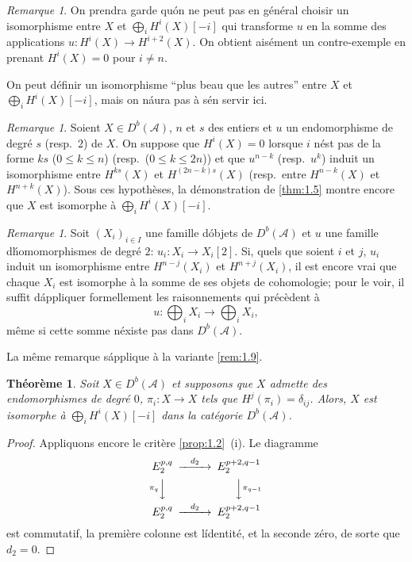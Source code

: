 \documentclass[12pt]{amsart}
\theoremstyle{plain}
\newtheorem{thm}[prop]{Th\'eor\`eme}
\theoremstyle{remark}
\newtheorem{rem}[prop]{Remarque}
\newcommand{\cA}{\mathscr{A}}
\newcommand{\db}{D^b}
\begin{document}
\begin{rem}\label{rem:1.8}
On prendra garde qu\'on ne peut pas en g\'en\'eral choisir un isomorphisme entre $X$ et $\bigoplus_i H^i(X)[-i]$ qui transforme $u$ en la somme des applications $u : H^i(X) \to H^{i+2}(X)$. On obtient ais\'ement un contre-exemple en prenant $H^i(X) = 0$ pour $i \not= n$.

On peut d\'efinir un isomorphisme ``plus beau que les autres'' entre $X$ et $\bigoplus_i H^i(X)[-i]$, mais on n\'aura pas \`a s\'en servir ici.
\end{rem}

\begin{rem}\label{rem:1.9}
Soient $X \in \db(\cA)$, $n$ et $s$ des entiers et $u$ un endomorphisme de degr\'e $s$ (resp.~$2$) de $X$. On suppose que $H^i(X) = 0$ lorsque $i$ n\'est pas de la forme $ks$ ($0 \leq k \leq n$) (resp.~($0 \leq k \leq 2n$)) et que $u^{n-k}$ (resp.~$u^k$) induit un isomorphisme entre $H^{ks}(X)$ et $H^{(2n-k)s}(X)$ (resp.~entre $H^{n-k}(X)$ et $H^{n+k}(X)$). Sous ces hypoth\`eses, la d\'emonstration de \eqref{thm:1.5} montre encore que $X$ est isomorphe \`a $\bigoplus_i H^i(X)[-i]$.
\end{rem}

\begin{rem}\label{rem:1.10}
Soit $(X_i)_{i \in I}$ une famille d\'objets de $\db(\cA)$ et $u$ une famille d\'homomorphismes de degr\'e $2$: $u_i : X_i \to X_i[2]$. Si, quels que soient $i$ et $j$, $u_i$ induit un isomorphisme entre $H^{n-j}(X_i)$ et $H^{n+j}(X_i)$, il est encore vrai que chaque $X_i$ est isomorphe \`a la somme de ses objets de cohomologie; pour le voir, il suffit d\'appliquer formellement les raisonnements qui pr\'ec\`edent \`a
\[
u : \bigoplus_i X_i \longrightarrow \bigoplus_i X_i,
\]
m\^eme si cette somme n\'existe pas dans $\db(\cA)$.

La m\^eme remarque s\'applique \`a la variante \eqref{rem:1.9}.
\end{rem}

\begin{thm}\label{thm:1.11}
Soit $X \in \db(\cA)$ et supposons que $X$ admette des endomorphismes de degr\'e $0$, $\pi_i : X \to X$ tels que $H^j(\pi_i) = \delta_{ij}$. Alors, $X$ est isomorphe \`a $\bigoplus_i H^i(X)[-i]$ dans la cat\'egorie $\db(\cA)$.
\end{thm}

\begin{proof}
Appliquons encore le crit\`ere \eqref{prop:1.2}~(i). Le diagramme
\[
\begin{CD}
E_2^{p,q} @>{d_2}>> E_2^{p+2,q-1} \\
@V{\pi_q}VV @VV{\pi_{q-1}}V \\
E_2^{p,q} @>{d_2}>> E_2^{p+2,q-1}
\end{CD}
\]
est commutatif, la premi\`ere colonne est l\'identit\'e, et la seconde z\'ero, de sorte que $d_2 = 0$.
\end{proof}
\end{document}
